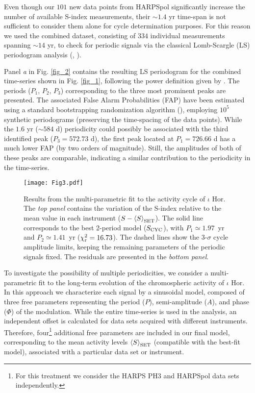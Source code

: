 \documentclass[a4paper,fleqn,usenatbib]{mnras}
\begin{document}
Even though our $101$ new data points from HARPSpol significantly increase the number of available S-index measurements, their $\sim$$1.4$ yr time-span is not sufficient to consider them alone for cycle determination purposes. For this reason we used the combined dataset, consisting of $334$ individual measurements spanning $\sim$$14$ yr, to check for periodic signals via the classical Lomb-Scargle (LS) periodogram analysis (, ). %

Panel \textit{a} in Fig. \ref{fig_2} contains the resulting LS periodogram for the combined time-series shown in Fig. \ref{fig_1}, following the power definition given by . The periods ($P_{1}$, $P_{2}$, $P_{3}$) corresponding to the three most prominent peaks are presented. The associated False Alarm Probabilities (FAP) have been estimated using a standard bootstrapping randomization algorithm (), employing $10^5$ synthetic periodograms (preserving the time-spacing of the data points). While the $1.6$ yr ($\sim$$584$ d) periodicity could possibly be associated with the third identified peak ($P_{3} = 572.73$ d), the first peak located at $P_{1} = 726.66$ d has a much lower FAP (by two orders of magnitude). Still, the amplitudes of both of these peaks are comparable, indicating a similar contribution to the periodicity in the time-series. 

\begin{figure*}
\texttt{[image: Fig3.pdf]}
\caption{Results from the multi-parametric fit to the activity cycle of $\iota$ Hor. The \textit{top panel} contains the variation of the S-index relative to the mean value in each instrument ($S - \left<S\right>_{\rm SET}$). The solid line corresponds to the best 2-period model ($S_{\rm CYC}$), with $P_{1} \simeq 1.97$~yr and $P_{2} \simeq 1.41$~yr ($\chi^2_{\rm r} = 16.73$). The dashed lines show the 3-$\sigma$ cycle amplitude limits, keeping the remaining parameters of the periodic signals fixed. The residuals are presented in the \textit{bottom panel}.}\label{fig_3}
\end{figure*}

To investigate the possibility of multiple periodicities, we consider a multi-parametric fit to the long-term evolution of the chromospheric activity of $\iota$ Hor. In this approach we characterize each signal by a sinusoidal model, composed of three free parameters representing the period ($P$), semi-amplitude ($A$), and phase ($\Phi$) of the modulation. While the entire time-series is used in the analysis, an independent offset is calculated for data sets acquired with different instruments. Therefore, four\footnote[9]{For this treatment we consider the HARPS PH3 and HARPSpol data sets independently.} additional free parameters are included in our final model, corresponding to the mean activity levels $\left<S\right>_{\rm SET}$ (compatible with the best-fit model), associated with a particular data set or instrument.
\end{document}
